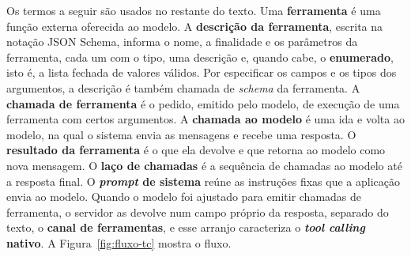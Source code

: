 Os termos a seguir são usados no restante do texto. Uma \textbf{ferramenta} é uma função externa oferecida ao modelo. A \textbf{descrição da ferramenta}, escrita na notação JSON Schema, informa o nome, a finalidade e os parâmetros da ferramenta, cada um com o tipo, uma descrição e, quando cabe, o \textbf{enumerado}, isto é, a lista fechada de valores válidos. Por especificar os campos e os tipos dos argumentos, a descrição é também chamada de \textit{schema} da ferramenta. A \textbf{chamada de ferramenta} é o pedido, emitido pelo modelo, de execução de uma ferramenta com certos argumentos. A \textbf{chamada ao modelo} é uma ida e volta ao modelo, na qual o sistema envia as mensagens e recebe uma resposta. O \textbf{resultado da ferramenta} é o que ela devolve e que retorna ao modelo como nova mensagem. O \textbf{laço de chamadas} é a sequência de chamadas ao modelo até a resposta final. O \textbf{\textit{prompt} de sistema} reúne as instruções fixas que a aplicação envia ao modelo. Quando o modelo foi ajustado para emitir chamadas de ferramenta, o servidor as devolve num campo próprio da resposta, separado do texto, o \textbf{canal de ferramentas}, e esse arranjo caracteriza o \textbf{\textit{tool calling} nativo}. A Figura~\ref{fig:fluxo-tc} mostra o fluxo.

